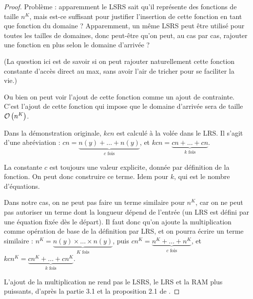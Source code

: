 \documentclass{report}
\begin{document}
\begin{proof}
{\begin{minipage}{0.9\textwidth}
{\begin{minipage}{0.95\textwidth}
						Problème : apparemment le LSRS sait qu'il représente des fonctions de taille $n^K$, mais est-ce suffisant pour justifier l'insertion de cette fonction en tant que fonction du domaine ? Apparemment, un même LSRS peut être utilisé pour toutes les tailles de domaines, donc peut-être qu'on peut, au cas par cas, rajouter une fonction en plus selon le domaine d'arrivée ?
						
						(La question ici est de savoir si on peut rajouter naturellement cette fonction constante d'accès direct au max, sans avoir l'air de tricher pour se faciliter la vie.)
						
						Ou bien on peut voir l'ajout de cette fonction comme un ajout de contrainte. C'est l'ajout de cette fonction qui impose que le domaine d'arrivée sera de taille $\mathcal{O}\left( n^K \right)$.
					\end{minipage} }
				
					
					Dans la démonstration originale, $kcn$ est calculé à la volée dans le LRS. Il s'agit d'une abréviation : $cn = \underset{c \text{ fois}}{\underbrace{n(y) + \dots + n(y)}}$, et $kcn = \underset{k \text{ fois}}{\underbrace{cn + \dots + cn}}$. 
					
					La constante $c$ est toujours une valeur explicite, donnée par définition de la fonction. On peut donc construire ce terme. Idem pour $k$, qui est le nombre d'équations. 
					
					Dans notre cas, on ne peut pas faire un terme similaire pour $n^K$, car on ne peut pas autoriser un terme dont la longueur dépend de l'entrée (un LRS est défini par une équation fixée dès le départ). Il faut donc qu'on ajoute la multiplication comme opération de base de la définition par LRS, et on pourra écrire un terme similaire : $n^K = \underset{K \text{ fois}}{\underbrace{n(y) \times \dots \times n(y)}}$, puis $cn^K = \underset{c \text{ fois}}{\underbrace{n^K + \dots + n^K}}$, et $kcn^K = \underset{k \text{ fois}}{\underbrace{cn^K + \dots + cn^K}}$. 
					
					L'ajout de la multiplication ne rend pas le LSRS, le LRS et la RAM plus puissants, d'après la partie 3.1 et la proposition 2.1 de \cite{GrandjeanSchwentick2002}. 
					

\end{minipage}}
\end{proof}
\end{document}
